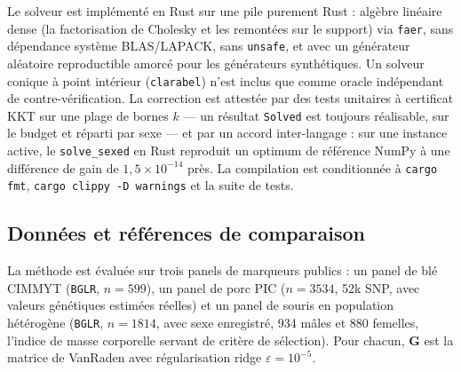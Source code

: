 \documentclass[11pt]{article}
\newcommand{\bG}{\mathbf{G}}
\begin{document}
Le solveur est implémenté en Rust sur une pile purement Rust : algèbre linéaire dense (la factorisation de Cholesky et les remontées sur le support) via \texttt{faer}, sans dépendance système BLAS/LAPACK, sans \texttt{unsafe}, et avec un générateur aléatoire reproductible amorcé pour les générateurs synthétiques. Un solveur conique à point intérieur (\texttt{clarabel}) n'est inclus que comme oracle indépendant de contre-vérification. La correction est attestée par des tests unitaires à certificat KKT sur une plage de bornes $k$ --- un résultat \texttt{Solved} est toujours réalisable, sur le budget et réparti par sexe --- et par un accord inter-langage : sur une instance active, le \texttt{solve\_sexed} en Rust reproduit un optimum de référence NumPy à une différence de gain de $1{,}5\times10^{-14}$ près. La compilation est conditionnée à \texttt{cargo fmt}, \texttt{cargo clippy -D warnings} et la suite de tests.

\subsection{Données et références de comparaison}

La méthode est évaluée sur trois panels de marqueurs publics : un panel de blé CIMMYT (\texttt{BGLR}, $n=599$), un panel de porc PIC ($n=3534$, 52k SNP, avec valeurs génétiques estimées réelles) et un panel de souris en population hétérogène (\texttt{BGLR}, $n=1814$, avec sexe enregistré, 934 mâles et 880 femelles, l'indice de masse corporelle servant de critère de sélection). Pour chacun, $\bG$ est la matrice de VanRaden avec régularisation ridge $\varepsilon=10^{-5}$.
\end{document}
